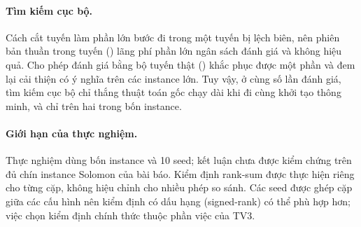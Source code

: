 \paragraph{Tìm kiếm cục bộ.} Cách cắt tuyến  làm phần lớn bước đi trong một tuyến bị
lệch biên, nên phiên bản thuần trong tuyến () lãng phí phần lớn ngân sách đánh giá và không
hiệu quả. Cho phép đánh giá bằng bộ tuyến thật () khắc phục được một phần và đem
lại cải thiện có ý nghĩa trên các instance lớn. Tuy vậy, ở cùng số lần đánh giá, tìm kiếm cục bộ chỉ thắng
thuật toán gốc chạy dài khi đi cùng khởi tạo thông minh, và chỉ trên hai trong bốn instance.

\paragraph{Giới hạn của thực nghiệm.} Thực nghiệm dùng bốn instance và 10 seed; kết luận chưa được kiểm
chứng trên đủ chín instance Solomon của bài báo. Kiểm định rank-sum được thực hiện riêng cho từng cặp,
không hiệu chỉnh cho nhiều phép so sánh. Các seed được ghép cặp giữa các cấu hình nên kiểm định có dấu
hạng (signed-rank) có thể phù hợp hơn; việc chọn kiểm định chính thức thuộc phần việc của TV3.
